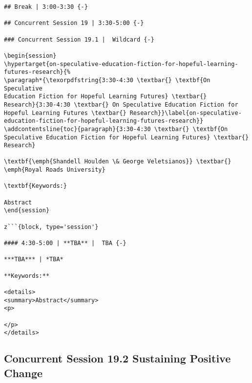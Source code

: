 \documentclass[
]{book}
\begin{document}
\begin{verbatim}
## Break | 3:00-3:30 {-}

## Concurrent Session 19 | 3:30-5:00 {-}

### Concurrent Session 19.1 |  Wildcard {-}

\begin{session}
\hypertarget{on-speculative-education-fiction-for-hopeful-learning-futures-research}{%
\paragraph*{\texorpdfstring{3:30-4:30 \textbar{} \textbf{On Speculative
Education Fiction for Hopeful Learning Futures} \textbar{}
Research}{3:30-4:30 \textbar{} On Speculative Education Fiction for Hopeful Learning Futures \textbar{} Research}}\label{on-speculative-education-fiction-for-hopeful-learning-futures-research}}
\addcontentsline{toc}{paragraph}{3:30-4:30 \textbar{} \textbf{On
Speculative Education Fiction for Hopeful Learning Futures} \textbar{}
Research}

\textbf{\emph{Shandell Houlden \& George Veletsianos}} \textbar{}
\emph{Royal Roads University}

\textbf{Keywords:}

Abstract
\end{session}

z```{block, type='session'}

#### 4:30-5:00 | **TBA** |  TBA {-}

***TBA*** | *TBA*

**Keywords:** 

<details>
<summary>Abstract</summary>
<p>

</p>
</details>
\end{verbatim}

\hypertarget{concurrent-session-19.2-sustaining-positive-change}{%
\subsection*{Concurrent Session 19.2 \textbar{} Sustaining Positive Change}\label{concurrent-session-19.2-sustaining-positive-change}}
\end{document}
